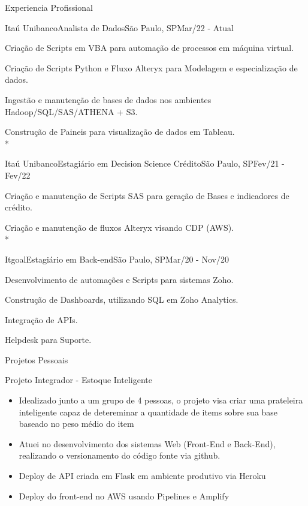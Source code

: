 \documentclass{article}
\newlength{\tabin}
\newlength{\secsep}
\newcommand{\lineunder}{\vspace*{-8pt} \\ \hspace*{-6pt} \hrulefill \\ \vspace*{-15pt}}
\newenvironment{tabbedsection}[1]{
  \begin{list}{}{
      \setlength{\itemsep}{0pt}
      \setlength{\labelsep}{0pt}
      \setlength{\labelwidth}{0pt}
      \setlength{\leftmargin}{\tabin}
      \setlength{\rightmargin}{\tabin}
      \setlength{\listparindent}{0pt}
      \setlength{\parsep}{0pt}
      \setlength{\parskip}{0pt}
      \setlength{\partopsep}{0pt}
      \setlength{\topsep}{#1}
    }
  \item[]
}{\end{list}}
\newenvironment{resume_section}[1]{
  \filbreak
  \vspace{2\secsep}
  \textsc{\large#1}
  \lineunder
  \begin{tabbedsection}{\secsep}
}{\end{tabbedsection}}
\newenvironment{resume_subsection}[2][]{
  \textbf{#2} \hfill {\footnotesize #1} \hspace{2em}
  \begin{tabbedsection}{0.5\secsep}
}{\end{tabbedsection}}
\newenvironment{subitems}{
  \renewcommand{\labelitemi}{-}
  \begin{itemize}
      \setlength{\labelsep}{1em}
}{\end{itemize}}
\newenvironment{resume_employer}[4]{
  \vspace{\secsep}
  \textbf{#1} \\ 
  \indent {\small #2} \hfill {\footnotesize#3 (#4)}
  \begin{tabbedsection}{0pt}
  \begin{subitems}
}{\end{subitems}\end{tabbedsection}}
\begin{document}
\begin{resume_section}{Experiencia Profissional}
  \begin{resume_employer}{Itaú Unibanco}{Analista de Dados}{São Paulo, SP}{Mar/22 - Atual}
    \item Criação de Scripts em VBA para automação de processos em máquina virtual. 
    \item Criação de Scripts Python e Fluxo Alteryx para Modelagem e especialização de dados.
    \item Ingestão e manutenção de bases de dados nos ambientes Hadoop/SQL/SAS/ATHENA + S3.
    \item Construção de Paineis para visualização de dados em Tableau. \\*
  \end{resume_employer}
  
  \begin{resume_employer}{Itaú Unibanco}{Estagiário em Decision Science Crédito}{São Paulo, SP}{Fev/21 - Fev/22}
    \item Criação e manutenção de Scripts SAS para geração de Bases e indicadores de crédito.
    \item Criação e manutenção de fluxos Alteryx visando CDP (AWS).\\*
  \end{resume_employer}
  
  \begin{resume_employer}{Itgoal}{Estagiário em Back-end}{São Paulo, SP}{Mar/20 - Nov/20}
    \item	Desenvolvimento de automações e Scripts para sistemas Zoho.
    \item	Construção de Dashboards, utilizando SQL em Zoho Analytics.
    \item	Integração de APIs.
    \item	Helpdesk para Suporte.
  \end{resume_employer}
\end{resume_section}


\begin{resume_section}{Projetos Pessoais}
  \begin{resume_subsection}[(Julho-2022)]{Projeto Integrador - Estoque Inteligente}
    \begin{subitems}
      \item Idealizado junto a um grupo de 4 pessoas, o projeto visa criar uma prateleira inteligente capaz de detereminar a quantidade de items sobre sua base baseado no peso médio do item
      \item Atuei no desenvolvimento dos sistemas Web (Front-End e Back-End), realizando o versionamento do código fonte via github.
      \item Deploy de API criada em Flask em ambiente produtivo via Heroku
      \item Deploy do front-end no AWS usando Pipelines e Amplify
    \end{subitems}
  \end{resume_subsection}
\end{resume_section}
\end{document}
